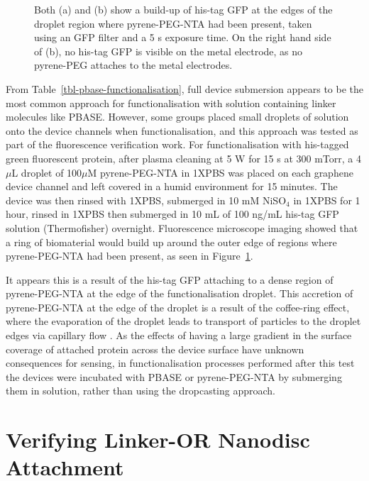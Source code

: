 \documentclass[
  a4paper,
]{scrbook}
\begin{document}
\begin{figure}
\begin{minipage}[t]{0.47\linewidth}
{{}

}

\subcaption{\label{fig-GFP-coffee-ring-2}}
\end{minipage}%

\caption{\label{fig-GFP-coffee-ring}Both (a) and (b) show a build-up of
his-tag GFP at the edges of the droplet region where pyrene-PEG-NTA had
been present, taken using an GFP filter and a 5 s exposure time. On the
right hand side of (b), no his-tag GFP is visible on the metal
electrode, as no pyrene-PEG attaches to the metal electrodes.}

\end{figure}

From Table~\ref{tbl-pbase-functionalisation}, full device submersion
appears to be the most common approach for functionalisation with
solution containing linker molecules like PBASE. However, some groups
placed small droplets of solution onto the device channels when
functionalisation, and this approach was tested as part of the
fluorescence verification work. For functionalisation with his-tagged
green fluorescent protein, after plasma cleaning at 5 W for 15 s at 300
mTorr, a 4 \(\mu\)L droplet of 100\(\mu\)M pyrene-PEG-NTA in 1XPBS was
placed on each graphene device channel and left covered in a humid
environment for 15 minutes. The device was then rinsed with 1XPBS,
submerged in 10 mM NiSO\(_4\) in 1XPBS for 1 hour, rinsed in 1XPBS then
submerged in 10 mL of 100 ng/mL his-tag GFP solution (Thermofisher)
overnight. Fluorescence microscope imaging showed that a ring of
biomaterial would build up around the outer edge of regions where
pyrene-PEG-NTA had been present, as seen in
Figure~\ref{fig-GFP-coffee-ring}.

It appears this is a result of the his-tag GFP attaching to a dense
region of pyrene-PEG-NTA at the edge of the functionalisation droplet.
This accretion of pyrene-PEG-NTA at the edge of the droplet is a result
of the coffee-ring effect, where the evaporation of the droplet leads to
transport of particles to the droplet edges via capillary flow
\autocite{Deegan1997,Shimobayashi2018}. As the effects of having a large
gradient in the surface coverage of attached protein across the device
surface have unknown consequences for sensing, in functionalisation
processes performed after this test the devices were incubated with
PBASE or pyrene-PEG-NTA by submerging them in solution, rather than
using the dropcasting approach.

\hypertarget{sec-linker-receptor-attachment}{%
\section{Verifying Linker-OR Nanodisc
Attachment}\label{sec-linker-receptor-attachment}}
\end{document}

